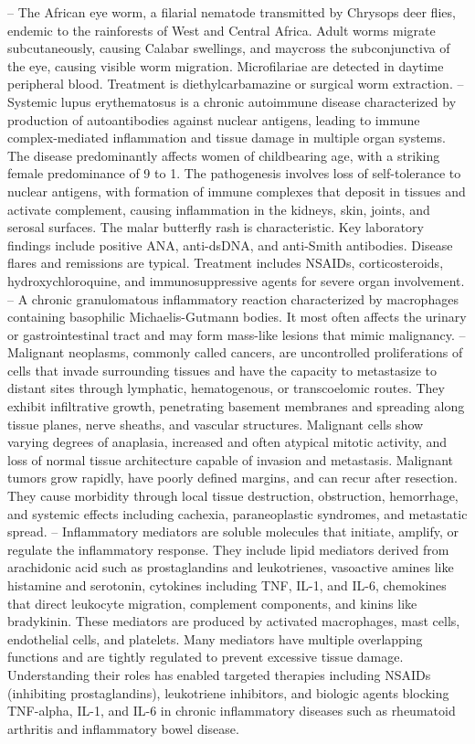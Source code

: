 -- The African eye worm, a filarial nematode transmitted by Chrysops deer flies, endemic to the rainforests of West and Central Africa. Adult worms migrate subcutaneously, causing Calabar swellings, and maycross the subconjunctiva of the eye, causing visible worm migration. Microfilariae are detected in daytime peripheral blood. Treatment is diethylcarbamazine or surgical worm extraction.
-- Systemic lupus erythematosus is a chronic autoimmune disease characterized by production of autoantibodies against nuclear antigens, leading to immune complex-mediated inflammation and tissue damage in multiple organ systems. The disease predominantly affects women of childbearing age, with a striking female predominance of 9 to 1. The pathogenesis involves loss of self-tolerance to nuclear antigens, with formation of immune complexes that deposit in tissues and activate complement, causing inflammation in the kidneys, skin, joints, and serosal surfaces. The malar butterfly rash is characteristic. Key laboratory findings include positive ANA, anti-dsDNA, and anti-Smith antibodies. Disease flares and remissions are typical. Treatment includes NSAIDs, corticosteroids, hydroxychloroquine, and immunosuppressive agents for severe organ involvement.
-- A chronic granulomatous inflammatory reaction characterized by macrophages containing basophilic Michaelis-Gutmann bodies. It most often affects the urinary or gastrointestinal tract and may form mass-like lesions that mimic malignancy.
-- Malignant neoplasms, commonly called cancers, are uncontrolled proliferations of cells that invade surrounding tissues and have the capacity to metastasize to distant sites through lymphatic, hematogenous, or transcoelomic routes. They exhibit infiltrative growth, penetrating basement membranes and spreading along tissue planes, nerve sheaths, and vascular structures. Malignant cells show varying degrees of anaplasia, increased and often atypical mitotic activity, and loss of normal tissue architecture capable of invasion and metastasis. Malignant tumors grow rapidly, have poorly defined margins, and can recur after resection. They cause morbidity through local tissue destruction, obstruction, hemorrhage, and systemic effects including cachexia, paraneoplastic syndromes, and metastatic spread.
-- Inflammatory mediators are soluble molecules that initiate, amplify, or regulate the inflammatory response. They include lipid mediators derived from arachidonic acid such as prostaglandins and leukotrienes, vasoactive amines like histamine and serotonin, cytokines including TNF, IL-1, and IL-6, chemokines that direct leukocyte migration, complement components, and kinins like bradykinin. These mediators are produced by activated macrophages, mast cells, endothelial cells, and platelets. Many mediators have multiple overlapping functions and are tightly regulated to prevent excessive tissue damage. Understanding their roles has enabled targeted therapies including NSAIDs (inhibiting prostaglandins), leukotriene inhibitors, and biologic agents blocking TNF-alpha, IL-1, and IL-6 in chronic inflammatory diseases such as rheumatoid arthritis and inflammatory bowel disease.
